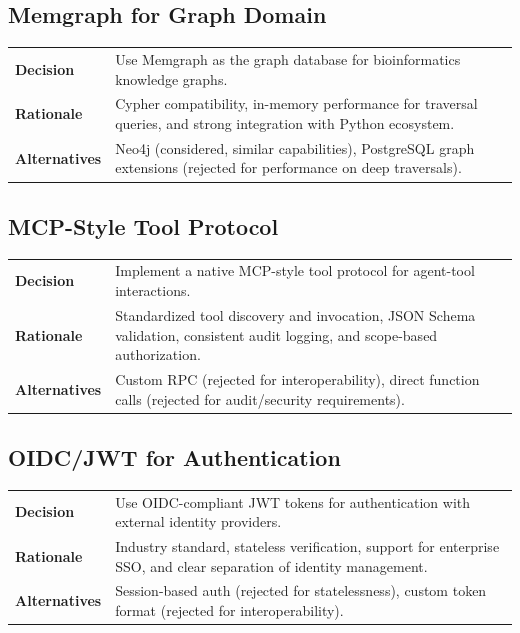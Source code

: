 \documentclass[a4paper,twoside]{sapthesis}
\begin{document}
\subsection{Memgraph for Graph Domain}

\begin{table}[ht]
\centering
\small
\begin{tabularx}{\textwidth}{lX}
    \hline
    \textbf{Decision} & Use Memgraph as the graph database for bioinformatics knowledge graphs. \\
    \textbf{Rationale} & Cypher compatibility, in-memory performance for traversal queries, and strong integration with Python ecosystem. \\
    \textbf{Alternatives} & Neo4j (considered, similar capabilities), PostgreSQL graph extensions (rejected for performance on deep traversals). \\
    \hline
\end{tabularx}
\end{table}

\subsection{MCP-Style Tool Protocol}

\begin{table}[ht]
\centering
\small
\begin{tabularx}{\textwidth}{lX}
    \hline
    \textbf{Decision} & Implement a native MCP-style tool protocol for agent-tool interactions. \\
    \textbf{Rationale} & Standardized tool discovery and invocation, JSON Schema validation, consistent audit logging, and scope-based authorization. \\
    \textbf{Alternatives} & Custom RPC (rejected for interoperability), direct function calls (rejected for audit/security requirements). \\
    \hline
\end{tabularx}
\end{table}

\subsection{OIDC/JWT for Authentication}

\begin{table}[ht]
\centering
\small
\begin{tabularx}{\textwidth}{lX}
    \hline
    \textbf{Decision} & Use OIDC-compliant JWT tokens for authentication with external identity providers. \\
    \textbf{Rationale} & Industry standard, stateless verification, support for enterprise SSO, and clear separation of identity management. \\
    \textbf{Alternatives} & Session-based auth (rejected for statelessness), custom token format (rejected for interoperability). \\
    \hline
\end{tabularx}
\end{table}
\end{document}
